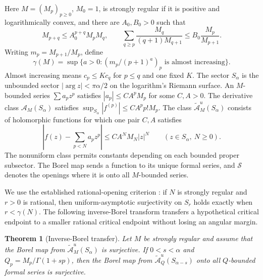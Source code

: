 \documentclass[11pt,a4paper]{article}
\newtheorem{theorem}{Theorem}[section]
\theoremstyle{remark}
\begin{document}
Here $M=(M_p)_{p\ge0}$, $M_0=1$, is strongly regular if it is positive
and logarithmically convex, and there are $A_0,B_0>0$ such that
\[
 M_{p+q}\le A_0^{p+q}M_pM_q,\qquad
 \sum_{q\ge p}\frac{M_q}{(q+1)M_{q+1}}
 \le B_0\frac{M_p}{M_{p+1}}.
\]
Writing $m_p=M_{p+1}/M_p$, define
\[
 \gamma(M)=\sup\{a>0:(m_p/(p+1)^a)_p
 \text{ is almost increasing}\}.
\]
Almost increasing means $c_p\le Kc_q$ for $p\le q$ and one fixed $K$.
The sector $S_\alpha$ is the unbounded sector
$|\arg z|<\pi\alpha/2$ on the logarithm's Riemann surface.
An $M$-bounded series $\sum a_pz^p$ satisfies
$|a_p|\le CA^pM_p$ for some $C,A>0$.
The derivative class $\mathcal A_M(S_\alpha)$ satisfies
$\sup_{S_\alpha}|f^{(p)}|\le CA^pp!M_p$.
The class $\widetilde{\mathcal A}^{u}_M(S_\alpha)$ consists of
holomorphic functions for which one pair $C,A$ satisfies
\begin{equation}
 \left|f(z)-\sum_{p<N}a_pz^p\right|
 \le CA^NM_N|z|^N
 \qquad(z\in S_\alpha,\ N\ge0).
 \label{eq:708-2}
\end{equation}
The nonuniform class permits constants depending on each bounded
proper subsector.  The Borel map sends a function to its unique formal
series, and $\mathcal S$ denotes the openings where it is onto all
$M$-bounded series.

We use the established rational-opening criterion
\cite[Theorem 4.17 and Corollary 4.18]{JimenezSanzSchindl2019}:
if $N$ is strongly regular and $r>0$ is rational, then
uniform-asymptotic surjectivity on $S_r$ holds exactly when
$r<\gamma(N)$.  The following inverse-Borel transform transfers a
hypothetical critical endpoint to a smaller rational critical endpoint
without losing an angular margin.

\begin{theorem}[Inverse-Borel transfer]
Let $M$ be strongly regular and assume that the Borel map from
$\widetilde{\mathcal A}^{u}_M(S_\alpha)$ is surjective.
If $0<s<\alpha$ and $Q_p=M_p/\Gamma(1+sp)$, then the Borel map from
$\widetilde{\mathcal A}^{u}_Q(S_{\alpha-s})$ onto all $Q$-bounded
formal series is surjective.
\end{theorem}
\end{document}
